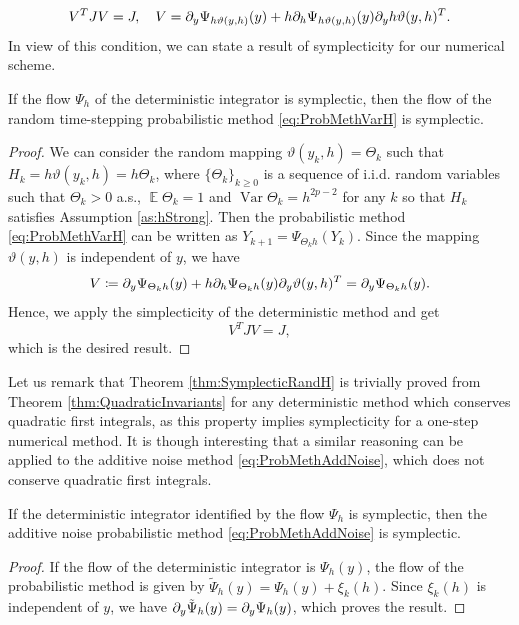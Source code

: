 \documentclass{siamart1116}
\numberwithin{theorem}{section}
\newcommand{\pdv}[2]{\ensuremath\partial_{#2}#1}
\newcommand{\defeq}{\coloneqq}
\newcommand{\Var}{\operatorname{Var}}
\newcommand{\E}{\operatorname{\mathbb{E}}}
\begin{document}
{\begin{equation}
	V^T J V = J, \quad V = \pdv{\Psi_{h\vartheta(y, h)}(y)}{y} + h\pdv{\Psi_{h\vartheta(y, h)}(y)}{h}\pdv{h\vartheta(y, h)}{y}^T.
\end{equation}
In view of this condition, we can state a result of symplecticity for our numerical scheme.
\begin{theorem}\label{thm:SymplecticRandH} If the flow $\Psi_h$ of the deterministic integrator is symplectic, then the flow of the random time-stepping probabilistic method \eqref{eq:ProbMethVarH} is symplectic.
\end{theorem}
\begin{proof} We can consider the random mapping $\vartheta(y_k, h) = \Theta_k$ such that $H_k = h\vartheta(y_k, h) = h\Theta_k$, where $\{\Theta_k\}_{k \geq 0}$ is a sequence of i.i.d. random variables such that $\Theta_k > 0$ a.s., $\E\Theta_k = 1$ and $\Var\Theta_k = h^{2p - 2}$ for any $k$ so that $H_k$ satisfies Assumption \ref{as:hStrong}. Then the probabilistic method \eqref{eq:ProbMethVarH} can be written as $Y_{k+1} = \Psi_{\Theta_k h}(Y_{k})$. Since the mapping $\vartheta(y, h)$ is independent of $y$, we have
\begin{equation}
	V \defeq \pdv{\Psi_{\Theta_k h}(y)}{y} + h\pdv{\Psi_{\Theta_k h}(y)}{h}\pdv{\vartheta(y, h)}{y}^T = \pdv{\Psi_{\Theta_k h}(y)}{y}.
\end{equation}
Hence, we apply the simplecticity of the deterministic method and get
\begin{equation}
	V^T J V = J,
\end{equation}
which is the desired result.
\end{proof}
Let us remark that Theorem \ref{thm:SymplecticRandH} is trivially proved from Theorem \ref{thm:QuadraticInvariants} for any deterministic method which conserves quadratic first integrals, as this property implies symplecticity for a one-step numerical method. It is though interesting that a similar reasoning can be applied to the additive noise method \eqref{eq:ProbMethAddNoise}, which does not conserve quadratic first integrals.
\begin{theorem}\label{thm:SymplecticAddNoise} If the deterministic integrator identified by the flow $\Psi_h$ is symplectic, then the additive noise probabilistic method \eqref{eq:ProbMethAddNoise} is symplectic.
\end{theorem}
\begin{proof} If the flow of the deterministic integrator is $\Psi_h(y)$, the flow of the probabilistic method is given by $\tilde\Psi_h(y) = \Psi_h(y) + \xi_k(h)$. Since $\xi_k(h)$ is independent of $y$, we have $\pdv{\tilde\Psi_h(y)}{y} = \pdv{\Psi_h(y)}{y}$, which proves the result.	
\end{proof}}
\end{document}
